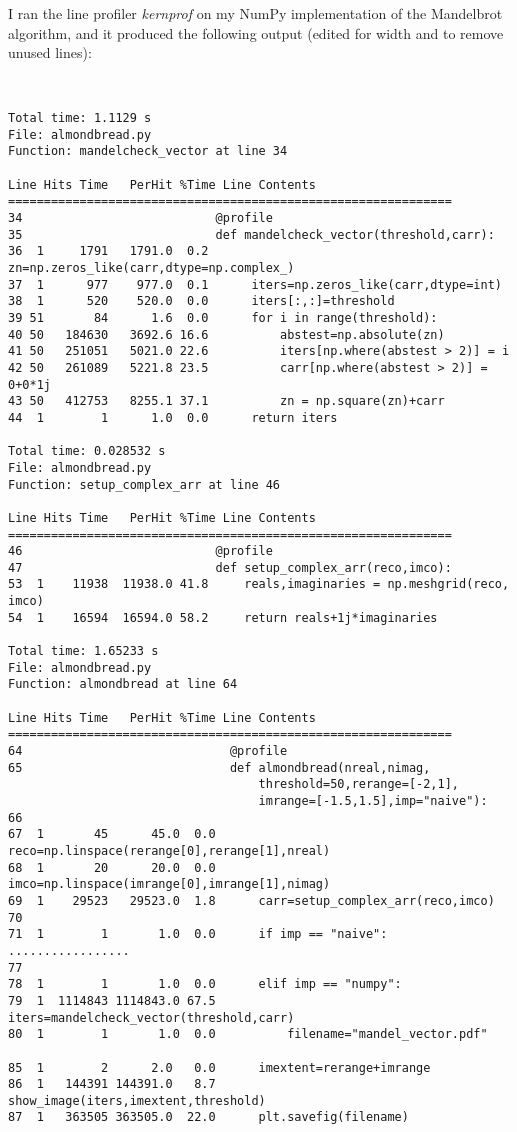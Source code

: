 \documentclass[paper=a4, fontsize=11pt]{scrartcl} %
\numberwithin{equation}{section} %
\numberwithin{figure}{section} %
\numberwithin{table}{section} %
\begin{document}
I ran the line profiler \emph{kernprof} on my NumPy implementation of the Mandelbrot algorithm, and it produced the following output (edited for width and to remove unused lines):

\begin{verbatim}


Total time: 1.1129 s
File: almondbread.py
Function: mandelcheck_vector at line 34

Line Hits Time   PerHit %Time Line Contents
==============================================================
34                           @profile
35                           def mandelcheck_vector(threshold,carr):
36  1     1791   1791.0  0.2      zn=np.zeros_like(carr,dtype=np.complex_)
37  1      977    977.0  0.1      iters=np.zeros_like(carr,dtype=int)
38  1      520    520.0  0.0      iters[:,:]=threshold
39 51       84      1.6  0.0      for i in range(threshold):
40 50   184630   3692.6 16.6          abstest=np.absolute(zn)
41 50   251051   5021.0 22.6          iters[np.where(abstest > 2)] = i
42 50   261089   5221.8 23.5          carr[np.where(abstest > 2)] = 0+0*1j
43 50   412753   8255.1 37.1          zn = np.square(zn)+carr
44  1        1      1.0  0.0      return iters

Total time: 0.028532 s
File: almondbread.py
Function: setup_complex_arr at line 46

Line Hits Time   PerHit %Time Line Contents
==============================================================
46                           @profile
47                           def setup_complex_arr(reco,imco):
53  1    11938  11938.0 41.8     reals,imaginaries = np.meshgrid(reco, imco)
54  1    16594  16594.0 58.2     return reals+1j*imaginaries

Total time: 1.65233 s
File: almondbread.py
Function: almondbread at line 64

Line Hits Time   PerHit %Time Line Contents
==============================================================
64                             @profile
65                             def almondbread(nreal,nimag,
                                   threshold=50,rerange=[-2,1],
                                   imrange=[-1.5,1.5],imp="naive"):
66                                           
67  1       45      45.0  0.0      reco=np.linspace(rerange[0],rerange[1],nreal)
68  1       20      20.0  0.0      imco=np.linspace(imrange[0],imrange[1],nimag)
69  1    29523   29523.0  1.8      carr=setup_complex_arr(reco,imco)
70                                    
71  1        1       1.0  0.0      if imp == "naive":
.................
77                                            
78  1        1       1.0  0.0      elif imp == "numpy":
79  1  1114843 1114843.0 67.5          iters=mandelcheck_vector(threshold,carr)
80  1        1       1.0  0.0          filename="mandel_vector.pdf"

85  1        2      2.0   0.0      imextent=rerange+imrange
86  1   144391 144391.0   8.7      show_image(iters,imextent,threshold)
87  1   363505 363505.0  22.0      plt.savefig(filename)
\end{verbatim}
\end{document}
